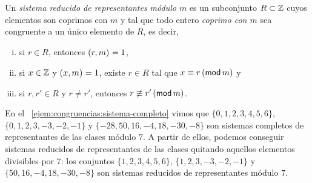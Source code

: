 \begin{defCongruencias}\label{def:congruencias:sistema-reducido}
	Un \emph{sistema reducido de representantes m\'odulo $m$} es un
	subconjunto $R\subset\Enteros$ cuyos elementos son coprimos con $m$
	y tal que todo entero \emph{coprimo con $m$} sea congruente a un
	\'unico elemento de $R$, es decir,
	\begin{enumerate}[(i)]
		\item\label{item:def:sistema-reducido:coprimo}
			si $r\in R$, entonces $\mcd{r,m}=1$,
		\item\label{item:def:sistema-reducido:existe}
			si $x\in\Enteros$ y $\mcd{x,m}=1$, existe $r\in R$
			tal que $x\equiv r\tmodulo[m]$ y
		\item\label{item:def:sistema-reducido:unico}
			si $r,r'\in R$ y $r\neq r'$, entonces
			$r\not\equiv r'\tmodulo[m]$.
	\end{enumerate}
\end{defCongruencias}

\begin{ejemCongruencias}\label{ejem:congruencias:sistema-reducido}
	En el \ejemname~\ref{ejem:congruencias:sistema-completo} vimos que
	$\{0,1,2,3,4,5,6\}$, $\{0,1,2,3,-3,-2,-1\}$ y
	$\{-28,50,16,-4,18,-30,-8\}$ son sistemas completos de representantes
	de las clases m\'odulo $7$. A partir de ellos, podemos conseguir
	sistemas reducidos de representantes de las clases quitando aquellos
	elementos divisibles por $7$: los conjuntos
	$\{1,2,3,4,5,6\}$, $\{1,2,3,-3,-2,-1\}$ y $\{50,16,-4,18,-30,-8\}$
	son sistemas reducidos de representantes m\'odulo $7$.
\end{ejemCongruencias}


